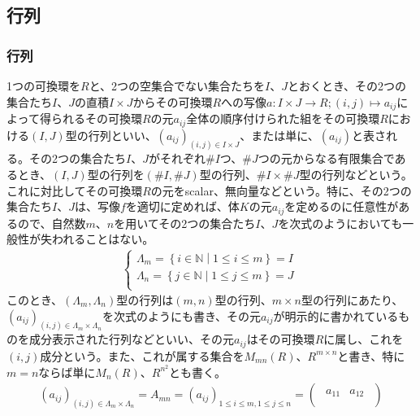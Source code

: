 \documentclass[dvipdfmx]{jsarticle}
\begin{document}
\subsection{行列}%
\subsubsection{行列}%
\begin{dfn}
1つの可換環を$R$と、2つの空集合でない集合たちを$I$、$J$とおくとき、その2つの集合たち$I$、$J$の直積$I \times J$からその可換環$R$への写像$a:I \times J \rightarrow R;(i,j) \mapsto a_{ij}$によって得られるその可換環$R$の元$a_{ij}$全体の順序付けられた組をその可換環$R$における$(I,J)$型の行列といい、$\left( a_{ij} \right)_{(i,j) \in I \times J}$、または単に、$\left( a_{ij} \right)$と表される。その2つの集合たち$I$、$J$がそれぞれ${\#}I$つ、${\#}J$つの元からなる有限集合であるとき、$(I,J)$型の行列を$\left( {\#}I,{\#}J \right)$型の行列、${\#}I \times {\#}J$型の行列などという。これに対比してその可換環$R$の元をscalar、無向量などという。特に、その2つの集合たち$I$、$J$は、写像$f$を適切に定めれば、体$K$の元$a_{ij}$を定めるのに任意性があるので、自然数$m$、$n$を用いてその2つの集合たち$I$、$J$を次式のようにおいても一般性が失われることはない。
\begin{align*}
\left\{ \begin{matrix}
\varLambda_{m} = \left\{ i \in \mathbb{N} \middle| 1 \leq i \leq m \right\} = I \\
\varLambda_{n} = \left\{ j \in \mathbb{N} \middle| 1 \leq j \leq m \right\} = J \\
\end{matrix} \right.\ 
\end{align*}
このとき、$\left( \varLambda_{m},\varLambda_{n} \right)$型の行列は$(m,n)$型の行列、$m \times n$型の行列にあたり、$\left( a_{ij} \right)_{(i,j) \in \varLambda_{m} \times \varLambda_{n}}$を次式のようにも書き、その元$a_{ij}$が明示的に書かれているものを成分表示された行列などといい、その元$a_{ij}$はその可換環$R$に属し、これを$(i,j)$成分という。また、これが属する集合を$M_{mn}(R)$、$R^{m \times n}$と書き、特に$m = n$ならば単に$M_{n}(R)$、$R^{n^{2}}$とも書く。
\begin{align*}
\left( a_{ij} \right)_{(i,j) \in \varLambda_{m} \times \varLambda_{n}} = A_{mn} = \left( a_{ij} \right)_{1 \leq i \leq m,1 \leq j \leq n} = \begin{pmatrix}
\begin{matrix}
a_{11} & a_{12} \\

\end{matrix}
\end{pmatrix}
\end{align*}
\end{dfn}
\end{document}

